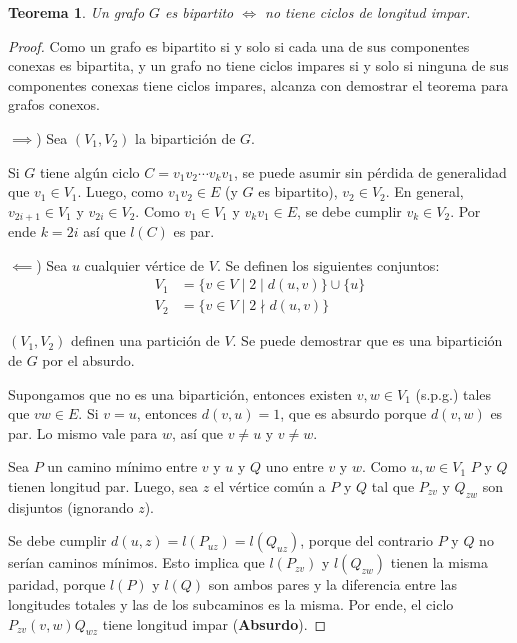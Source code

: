 \documentclass[a4paper]{report}
\newtheorem*{theorem*}{Teorema}
\begin{document}
\begin{theorem*}
    Un grafo $G$ es bipartito $\iff$ no tiene ciclos de longitud impar.
\end{theorem*}
\begin{proof}
    Como un grafo es bipartito si y solo si cada una de sus componentes conexas es bipartita, y un grafo no tiene ciclos impares si y solo si ninguna de sus componentes conexas tiene ciclos impares, alcanza con demostrar el teorema para grafos conexos.

    $\implies$) Sea $(V_1, V_2)$ la bipartición de $G$.

    Si $G$ tiene algún ciclo $C = v_1v_2 \cdots v_kv_1$, se puede asumir sin pérdida de generalidad que $v_1 \in V_1$. Luego, como $v_1v_2 \in E$ (y $G$ es bipartito), $v_2 \in V_2$. En general, $v_{2i+1} \in V_1$ y $v_{2i} \in V_2$. Como $v_1 \in V_1$ y $v_kv_1 \in E$, se debe cumplir $v_k \in V_2$. Por ende $k = 2i$ así que $l(C)$ es par.

    $\impliedby$) Sea $u$ cualquier vértice de $V$. Se definen los siguientes conjuntos:
    \begin{align*}
        V_1 & = \{v \in V \mid 2 \mid d(u, v)\} \cup \{u\} \\
        V_2 & = \{v \in V \mid 2 \nmid d(u, v)\}
    \end{align*}

    $(V_1,V_2)$ definen una partición de $V$. Se puede demostrar que es una bipartición de $G$ por el absurdo.

    Supongamos que no es una bipartición, entonces existen $v, w \in V_1$ (s.p.g.) tales que $vw \in E$. Si $v = u$, entonces $d(v,u) = 1$, que es absurdo porque $d(v, w)$ es par. Lo mismo vale para $w$, así que $v \neq u$ y $v \neq w$.

    Sea $P$ un camino mínimo entre $v$ y $u$ y $Q$ uno entre $v$ y $w$. Como $u, w \in V_1$ $P$ y $Q$ tienen longitud par. Luego, sea $z$ el vértice común a $P$ y $Q$ tal que $P_{zv}$ y $Q_{zw}$ son disjuntos (ignorando $z$).

    Se debe cumplir $d(u, z) = l(P_{uz}) = l(Q_{uz})$, porque del contrario $P$ y $Q$ no serían caminos mínimos. Esto implica que $l(P_{zv})$ y $l(Q_{zw})$ tienen la misma paridad, porque $l(P)$ y $l(Q)$ son ambos pares y la diferencia entre las longitudes totales y las de los subcaminos es la misma. Por ende, el ciclo $P_{zv}(v, w)Q_{wz}$ tiene longitud impar (\textbf{Absurdo}).

\end{proof}
\end{document}
